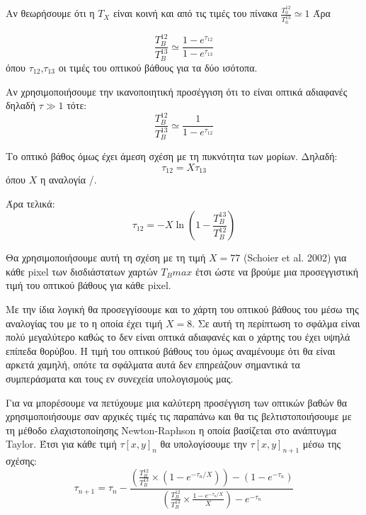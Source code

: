 \documentclass[a4paper,12pt]{memoir}
\begin{document}
Αν θεωρήσουμε ότι η $T_X$ είναι κοινή και από τις τιμές του πίνακα $\frac{T_0 ^{12}}{T_0 ^{13}} \simeq 1$
Άρα

\begin{equation}
\frac{T_B ^{12}}{T_B ^{13}} \simeq \frac{1-e^{\tau _{12}}}{1-e^{\tau _{13}}}
\end{equation}
όπου $\tau _{12}$,$\tau _{13}$ οι τιμές του οπτικού βάθους για τα δύο ισότοπα.

Αν χρησιμοποιήσουμε την ικανοποιητική προσέγγιση ότι το   είναι οπτικά αδιαφανές δηλαδή $\tau \gg 1$ τότε:
\begin{equation}
\frac{T_B ^{12}}{T_B ^{13}} \simeq \frac{1}{1-e^{\tau _{12}}}
\end{equation}

Το οπτικό βάθος όμως έχει άμεση σχέση με τη πυκνότητα των μορίων. Δηλαδή:
\begin{equation}
\tau _{12} = X \tau _{13}
\end{equation}
όπου $X$ η αναλογία /.

Άρα τελικά:
\begin{equation}
\tau _{12} = -X \ln \left( 1-\frac{T_B ^{13}}{T_B ^{12}} \right) 
\end{equation}

Θα χρησιμοποιήσουμε αυτή τη σχέση με τη τιμή $X=77$ (Schoier et al. 2002) για κάθε pixel των δισδιάστατων χαρτών $T_Bmax$ έτσι ώστε να βρούμε μια προσεγγιστική τιμή του οπτικού βάθους για κάθε pixel. 

Με την ίδια λογική θα προσεγγίσουμε και το χάρτη του οπτικού βάθους του  μέσω της αναλογίας του με το  η οποία έχει τιμή $X=8$. Σε αυτή τη περίπτωση το σφάλμα είναι πολύ μεγαλύτερο καθώς το  δεν είναι οπτικά αδιαφανές και ο χάρτης του  έχει υψηλά επίπεδα θορύβου. Η τιμή του οπτικού βάθους του  όμως αναμένουμε ότι θα είναι αρκετά χαμηλή, οπότε τα σφάλματα αυτά δεν επηρεάζουν σημαντικά τα συμπεράσματα και τους εν συνεχεία υπολογισμούς μας.

Για να μπορέσουμε να πετύχουμε μια καλύτερη προσέγγιση των οπτικών βαθών θα χρησιμοποιήσουμε σαν αρχικές τιμές τις παραπάνω και θα τις βελτιστοποιήσουμε με τη μέθοδο ελαχιστοποίησης Newton-Raphson η οποία βασίζεται στο ανάπτυγμα Taylor. Έτσι για κάθε τιμή $\tau[x,y] _n$ θα υπολογίσουμε την $\tau[x,y] _{n+1}$ μέσω της σχέσης:
\begin{equation}
\tau _{n+1} = \tau _n -\frac{\left( \frac{T_B ^{12}}{T_B ^{13}} \times (1-e^{-\tau _n/X}) \right)-(1-e^{-\tau _n} ) } {\left( \frac{T_B ^{12}}{T_B ^{13}} \times \frac{1-e^{-\tau _n /X}}{X} \right) -e^{-\tau _n}}
\end{equation}
\end{document}
